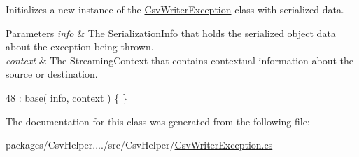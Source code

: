 Initializes a new instance of the \hyperlink{a00060}{Csv\-Writer\-Exception} class with serialized data. 


\begin{DoxyParams}{Parameters}
{\em info} & The Serialization\-Info that holds the serialized object data about the exception being thrown.\\
\hline
{\em context} & The Streaming\-Context that contains contextual information about the source or destination.\\
\hline
\end{DoxyParams}

\begin{DoxyCode}
48 : base( info, context ) \{ \}
\end{DoxyCode}


The documentation for this class was generated from the following file\-:\begin{DoxyCompactItemize}
\item 
packages/\-Csv\-Helper..../src/\-Csv\-Helper/\hyperlink{a00203}{Csv\-Writer\-Exception.\-cs}\end{DoxyCompactItemize}
